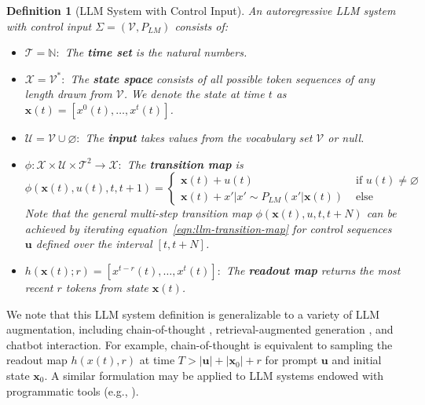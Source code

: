 \documentclass{article} %
\newtheorem{definition}{Definition}
\begin{document}
\begin{definition}[LLM System with Control Input]
\label{def:llm-system} 
An autoregressive LLM system with control input $\Sigma = (\mathcal V, P_{LM})$ consists of:
\begin{itemize}
    \item $\mathcal T = \mathbb N:$ The \textbf{time set} is the natural numbers. 
    \item $\mathcal X = \mathcal V^*:$ The \textbf{state space} consists of all possible token sequences of any length drawn from $\mathcal V$. We denote the state at time $t$ as $\mathbf x(t) = [x^0(t), \dots, x^t(t)]$. %
    \item $\mathcal U = \mathcal V \cup \varnothing:$ The \textbf{input} takes values from the vocabulary set $\mathcal V$ or null. 
    \item $\phi: \mathcal X \times \mathcal U \times \mathcal T^2 \to \mathcal X: $ The \textbf{transition map} is 
    \begin{equation}
        \label{eqn:llm-transition-map}
        \phi(\mathbf x(t), u(t), t, t+1) = \begin{cases}
            \mathbf x(t) + u(t) & \text{ if } u(t) \neq \varnothing \\ 
            \mathbf x(t) + x' | x' \sim P_{LM}(x' | \mathbf x(t)) & \text{ else } 
        \end{cases}
    \end{equation}
    Note that the general multi-step transition map $\phi(\mathbf x(t), u, t, t+N)$ can be achieved by iterating equation~\ref{eqn:llm-transition-map} for control sequences $\mathbf u$ defined over the interval $[t, t+N]$. 

    \item $h(\mathbf x(t); r) = [x^{t-r}(t), \dots, x^t(t)]:$ The \textbf{readout map} returns the most recent $r$ tokens from state $\mathbf x(t)$. 
\end{itemize}
\end{definition}

We note that this LLM system definition is generalizable to a variety of LLM augmentation, including chain-of-thought \citep{wei2023chainofthought}, retrieval-augmented generation \citep{lewis2020retrieval}, and chatbot interaction. For example, chain-of-thought is equivalent to sampling the readout map $h(x(t), r)$ at time $T > |\mathbf u| + |\mathbf x_0| + r$ for prompt $\mathbf u$ and initial state $\mathbf x_0$. A similar formulation may be applied to LLM systems endowed with programmatic tools (e.g., \cite{patil2023gorilla}). 
\end{document}

